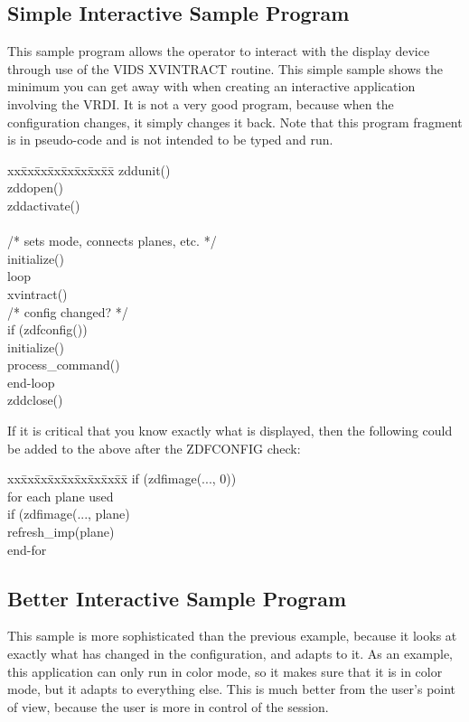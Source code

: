 \subsection{Simple Interactive Sample Program}
This sample program allows the operator to interact with the display
device through use of the VIDS XVINTRACT routine.  This simple sample
shows the minimum you can get away with when creating
an interactive application involving the VRDI.  It is not
a very good program, because when the configuration changes, it simply
changes it back.  Note that this program fragment is in pseudo-code and
is not intended to be typed and run.
\begin{tabbing}
xx\=xx\=xx\=xx\=xx\=xx\=xx\=xx\=\kill
\>zddunit()\\
\>zddopen()\\
\>zddactivate()\\
\\
\>/*  sets mode, connects planes, etc.  */\\
\>initialize()\\
\>loop\\
\>\>xvintract()\\
\>\>/*  config changed?  */\\
\>\>if (zdfconfig())\\
\>\>\>initialize()\\
\>\>process\_command()\\
\>end-loop\\
\>zddclose()\\
\end{tabbing}
If it is critical that you know exactly what is displayed, then the
following could be added to the above after the ZDFCONFIG check:
\begin{tabbing}
xx\=xx\=xx\=xx\=xx\=xx\=xx\=xx\=xx\=\kill
\>if (zdfimage(..., 0))\\
\>\>for each plane used\\
\>\>\>if (zdfimage(..., plane)\\
\>\>\>\>refresh\_imp(plane)\\
\>\>end-for\\
\end{tabbing}
\newpage
\subsection{Better Interactive Sample Program}
This sample is more sophisticated than the previous example, because
it looks at exactly what has changed in the configuration, and adapts
to it.  As an example, this application can only run in color mode,
so it makes sure that it is in color mode, but it adapts to everything
else.  This is much better from the user's point of view, because the
user is more in control of the session.

